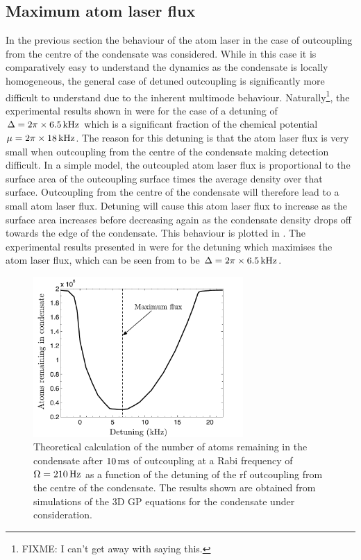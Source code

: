 \subsection{Maximum atom laser flux}

In the previous section the behaviour of the atom laser in the case of outcoupling from the centre of the condensate was considered. While in this case it is comparatively easy to understand the dynamics as the condensate is locally homogeneous, the general case of detuned outcoupling is significantly more difficult to understand due to the inherent multimode behaviour. Naturally\footnote{FIXME: I can't get away with saying this.}, the experimental results shown in  were for the case of a detuning of $\Delta = 2\pi \times \unit[6.5]{kHz}$ which is a significant fraction of the chemical potential $\mu = 2\pi \times \unit[18]{kHz}$. The reason for this detuning is that the atom laser flux is very small when outcoupling from the centre of the condensate making detection difficult. In a simple model, the outcoupled atom laser flux is proportional to the surface area of the outcoupling surface times the average density over that surface. Outcoupling from the centre of the condensate will therefore lead to a small atom laser flux. Detuning will cause this atom laser flux to increase as the surface area increases before decreasing again as the condensate density drops off towards the edge of the condensate. This behaviour is plotted in . The experimental results presented in  were for the detuning which maximises the atom laser flux, which can be seen from  to be $\Delta = 2\pi \times \unit[6.5]{kHz}$.

\begin{figure}
    \centering
    \includegraphics[width=8cm]{DetuningCurve}
    \caption{\label{Peaks:DetuningCurve} Theoretical calculation of the number of atoms remaining in the condensate after $\unit[10]{ms}$ of outcoupling at a Rabi frequency of $\Omega = \unit[210]{Hz}$ as a function of the detuning of the rf outcoupling from the centre of the condensate. The results shown are obtained from simulations of the 3D GP equations for the condensate under consideration.}
\end{figure}

